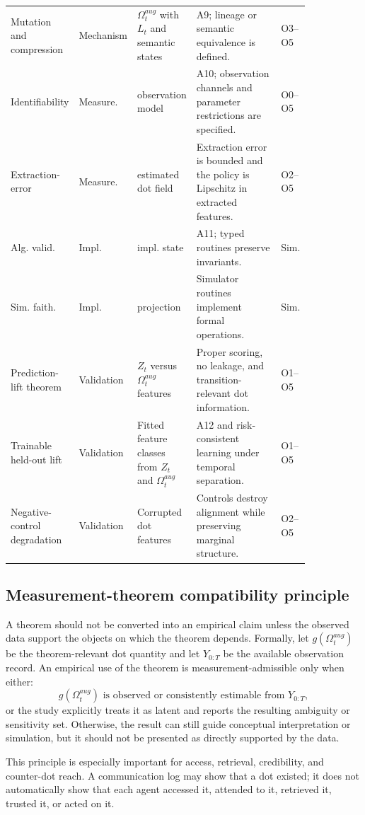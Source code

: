 \documentclass[11pt]{article}
\theoremstyle{remark}
\begin{document}
{\begin{longtable}{@{}L{0.15\linewidth}L{0.12\linewidth}L{0.17\linewidth}L{0.32\linewidth}L{0.08\linewidth}@{}}
Mutation and compression & Mechanism & $\Omega_t^{aug}$ with $L_t$ and semantic states & A9; lineage or semantic equivalence is defined. & O3--O5\\
Identifiability & Measure. & observation model & A10; observation channels and parameter restrictions are specified. & O0--O5\\
Extraction-error & Measure. & estimated dot field & Extraction error is bounded and the policy is Lipschitz in extracted features. & O2--O5\\
Alg. valid. & Impl. & impl. state & A11; typed routines preserve invariants. & Sim.\\
Sim. faith. & Impl. & projection & Simulator routines implement formal operations. & Sim.\\
Prediction-lift theorem & Validation & $Z_t$ versus $\Omega_t^{aug}$ features & Proper scoring, no leakage, and transition-relevant dot information. & O1--O5\\
Trainable held-out lift & Validation & Fitted feature classes from $Z_t$ and $\Omega_t^{aug}$ & A12 and risk-consistent learning under temporal separation. & O1--O5\\
Negative-control degradation & Validation & Corrupted dot features & Controls destroy alignment while preserving marginal structure. & O2--O5\\
\bottomrule
\end{longtable}
}

\subsection{Measurement-theorem compatibility principle}\label{measurement-theorem-compatibility-principle}

A theorem should not be converted into an empirical claim unless the observed data support the objects on which the theorem depends. Formally, let $g(\Omega_t^{aug})$ be the theorem-relevant dot quantity and let $Y_{0:T}$ be the available observation record. An empirical use of the theorem is measurement-admissible only when either:
\[
 g(\Omega_t^{aug}) \text{ is observed or consistently estimable from } Y_{0:T},
\]
or the study explicitly treats it as latent and reports the resulting ambiguity or sensitivity set. Otherwise, the result can still guide conceptual interpretation or simulation, but it should not be presented as directly supported by the data.

This principle is especially important for access, retrieval, credibility, and counter-dot reach. A communication log may show that a dot existed; it does not automatically show that each agent accessed it, attended to it, retrieved it, trusted it, or acted on it.
\end{document}
